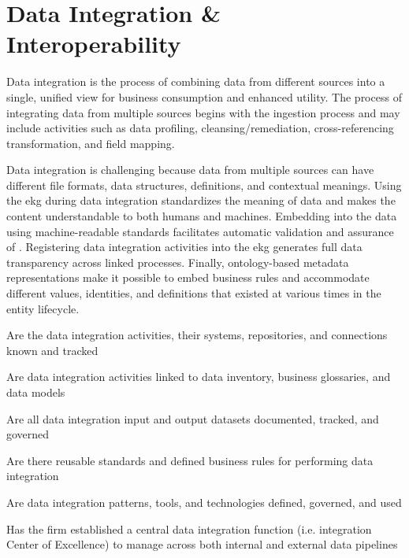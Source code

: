 \section[Data Integration]{Data Integration \& Interoperability}%
\label{sec:ekgmm-b-2-5}
\label{sec:ekg-mm-data-integration}

Data integration is the process of combining data from different sources into a single, unified view for
business consumption and enhanced utility.
The process of integrating data from multiple sources begins with the ingestion process and may include activities
such as data profiling, cleansing/remediation, cross-referencing transformation, and field mapping.

\ekgmmContextSection

Data integration is challenging because data from multiple sources can have different file formats, data structures,
definitions, and contextual meanings.
Using the \gls{ekg} during data integration standardizes the meaning of data and makes the content understandable
to both humans and machines.
Embedding  into the data using machine-readable standards facilitates
automatic validation and assurance of .
Registering data integration activities into the \gls{ekg} generates full data transparency across
linked processes.
Finally, ontology-based metadata representations make it possible to embed business rules and accommodate
different values, identities, and definitions that existed at various times in the entity lifecycle.

\kgmmcorequestionssection

\begin{core-questions}

  \item [\thesection.1] Are the data integration activities, their systems, repositories, and connections
                        known and tracked
  \item [\thesection.2] Are data integration activities linked to data inventory, business glossaries, and data models
  \item [\thesection.3] Are all data integration input and output datasets documented, tracked, and governed
  \item [\thesection.4] Are there reusable standards and defined business rules for performing data integration
  \item [\thesection.5] Are data integration patterns, tools, and technologies defined, governed, and used
  \item [\thesection.6] Has the firm established a central data integration function
                        (i.e. integration Center of Excellence) to manage  across both
                        internal and external data pipelines
\end{core-questions}

